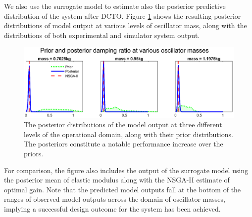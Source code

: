 \documentclass[12pt]{article}
\begin{document}
%
We also use the surrogate model to estimate also the posterior predictive distribution of the system after DCTO.
%
Figure \ref{fig:dvs_output} shows the resulting posterior distributions of model output at various levels of oscillator mass, along with the distributions of both experimental and simulator system output.
%
\begin{figure}
	\centering
	\includegraphics[scale=0.85]{FIG_DVS_DCTO_prior_and_posterior_output}
	\captionsetup{width=.85\linewidth}
	\caption{The posterior distributions of the model output at three different levels of the operational domain, along with their prior distributions. The posteriors constitute a notable performance increase over the priors.}
	\label{fig:dvs_output}
\end{figure}
%
For comparison, the figure also includes the output of the surrogate model using the posterior mean of elastic modulus along with the NSGA-II estimate of optimal gain.
%
Note that the predicted model outputs fall at the bottom of the ranges of observed model outputs across the domain of oscillator masses, implying a successful design outcome for the system has been achieved.
%

%
\end{document}
